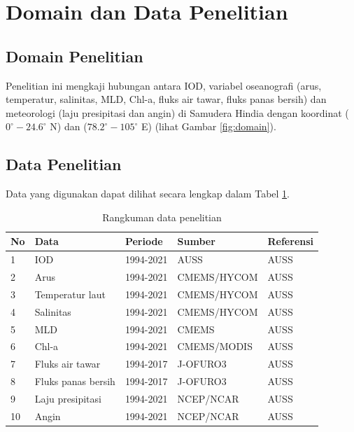 \vspace{1.5pc}
\section[Domain dan Data Penelitian]{Domain dan Data Penelitian}
\begin{spacing}{1.5}
	\subsection[Domain Penelitian]{Domain Penelitian}
	Penelitian ini mengkaji hubungan antara IOD, variabel oseanografi (arus, temperatur, salinitas, MLD, Chl-a, fluks air tawar, fluks panas bersih) dan meteorologi (laju presipitasi dan angin) di Samudera Hindia dengan koordinat ($0^\circ-24.6^\circ$ N) dan ($78.2^\circ-105^\circ$ E) (lihat Gambar \ref{fig:domain}).

	\subsection[Data Penelitian]{Data Penelitian}
	Data yang digunakan dapat dilihat secara lengkap dalam Tabel \ref*{tab:data}.
	\begin{table}[H]
		\centering
		\caption{Rangkuman data penelitian}
		\label{tab:data}
		\begin{tabular}{|l|l|l|l|l|}
			\hline
			No & Data               & Periode   & Sumber      & Referensi \\ \hline
			1  & IOD                & 1994-2021 & AUSS        & AUSS      \\ \hline
			2  & Arus               & 1994-2021 & CMEMS/HYCOM & AUSS      \\ \hline
			3  & Temperatur laut    & 1994-2021 & CMEMS/HYCOM & AUSS      \\ \hline
			4  & Salinitas          & 1994-2021 & CMEMS/HYCOM & AUSS      \\ \hline
			5  & MLD                & 1994-2021 & CMEMS       & AUSS      \\ \hline
			6  & Chl-a              & 1994-2021 & CMEMS/MODIS & AUSS      \\ \hline
			7  & Fluks air tawar    & 1994-2017 & J-OFURO3    & AUSS      \\ \hline
			8  & Fluks panas bersih & 1994-2017 & J-OFURO3    & AUSS      \\ \hline
			9  & Laju presipitasi   & 1994-2021 & NCEP/NCAR   & AUSS      \\ \hline
			10 & Angin              & 1994-2021 & NCEP/NCAR   & AUSS      \\ \hline
		\end{tabular}
	\end{table}

\end{spacing}
